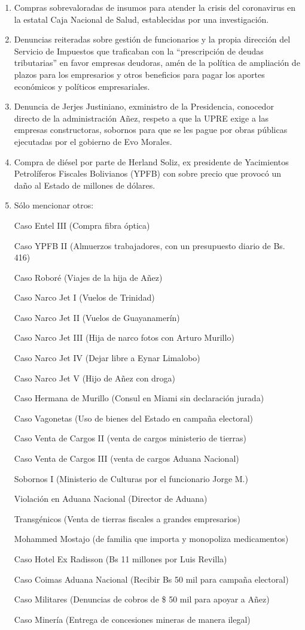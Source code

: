 \documentclass[a4paper, nobind]{templates/ociamthesis}
\begin{document}
\begin{enumerate}
\item
  Compras sobrevaloradas de insumos para atender la crisis del coronavirus en la estatal Caja Nacional de Salud, establecidas por una investigación.
\item
  Denuncias reiteradas sobre gestión de funcionarios y la propia dirección del Servicio de Impuestos que traficaban con la ``prescripción de deudas tributarias'' en favor empresas deudoras, amén de la política de ampliación de plazos para los empresarios y otros beneficios para pagar los aportes económicos y políticos empresariales.
\item
  Denuncia de Jerjes Justiniano, exministro de la Presidencia, conocedor directo de la administración Añez, respeto a que la UPRE exige a las empresas constructoras, sobornos para que se les pague por obras públicas ejecutadas por el gobierno de Evo Morales.
\item
  Compra de diésel por parte de Herland Soliz, ex presidente de Yacimientos Petrolíferos Fiscales Bolivianos (YPFB) con sobre precio que provocó un daño al Estado de millones de dólares.
\item
  Sólo mencionar otros:

  Caso Entel III (Compra fibra óptica)

  Caso YPFB II (Almuerzos trabajadores, con un presupuesto diario de Bs. 416)

  Caso Roboré (Viajes de la hija de Añez)

  Caso Narco Jet I (Vuelos de Trinidad)

  Caso Narco Jet II (Vuelos de Guayanamerín)

  Caso Narco Jet III (Hija de narco fotos con Arturo Murillo)

  Caso Narco Jet IV (Dejar libre a Eynar Limalobo)

  Caso Narco Jet V (Hijo de Añez con droga)

  Caso Hermana de Murillo (Consul en Miami sin declaración jurada)

  Caso Vagonetas (Uso de bienes del Estado en campaña electoral)

  Caso Venta de Cargos II (venta de cargos ministerio de tierras)

  Caso Venta de Cargos III (venta de cargos Aduana Nacional)

  Sobornos I (Ministerio de Culturas por el funcionario Jorge M.)

  Violación en Aduana Nacional (Director de Aduana)

  Transgénicos (Venta de tierras fiscales a grandes empresarios)

  Mohammed Mostajo (de familia que importa y monopoliza medicamentos)

  Caso Hotel Ex Radisson (Bs 11 millones por Luis Revilla)

  Caso Coimas Aduana Nacional (Recibir Bs 50 mil para campaña electoral)

  Caso Militares (Denuncias de cobros de \$ 50 mil para apoyar a Añez)

  Caso Minería (Entrega de concesiones mineras de manera ilegal)
\end{enumerate}
\end{document}
